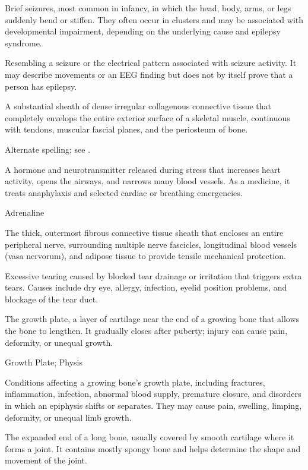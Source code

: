  Brief seizures, most common in infancy, in which the head, body, arms, or legs suddenly bend or stiffen. They often occur in clusters and may be associated with developmental impairment, depending on the underlying cause and epilepsy syndrome.

 Resembling a seizure or the electrical pattern associated with seizure activity. It may describe movements or an EEG finding but does not by itself prove that a person has epilepsy.

 A substantial sheath of dense irregular collagenous connective tissue that completely envelops the entire exterior surface of a skeletal muscle, continuous with tendons, muscular fascial planes, and the periosteum of bone.

 Alternate spelling; see .

 A hormone and neurotransmitter released during stress that increases heart activity, opens the airways, and narrows many blood vessels. As a medicine, it treats anaphylaxis and selected cardiac or breathing emergencies.

\synonyms
Adrenaline

 The thick, outermost fibrous connective tissue sheath that encloses an entire peripheral nerve, surrounding multiple nerve fascicles, longitudinal blood vessels (vasa nervorum), and adipose tissue to provide tensile mechanical protection.

 Excessive tearing caused by blocked tear drainage or irritation that triggers extra tears. Causes include dry eye, allergy, infection, eyelid position problems, and blockage of the tear duct.

 The growth plate, a layer of cartilage near the end of a growing bone that allows the bone to lengthen. It gradually closes after puberty; injury can cause pain, deformity, or unequal growth.

\synonyms
Growth Plate; Physis

 Conditions affecting a growing bone’s growth plate, including fractures, inflammation, infection, abnormal blood supply, premature closure, and disorders in which an epiphysis shifts or separates. They may cause pain, swelling, limping, deformity, or unequal limb growth.

 The expanded end of a long bone, usually covered by smooth cartilage where it forms a joint. It contains mostly spongy bone and helps determine the shape and movement of the joint.

